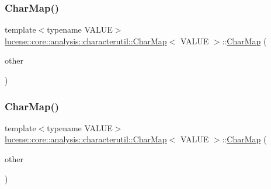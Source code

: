 \subsubsection{\texorpdfstring{Char\+Map()}{CharMap()}\hspace{0.1cm}{\footnotesize\ttfamily [4/5]}}
{\footnotesize\ttfamily template$<$typename V\+A\+L\+UE$>$ \\
\mbox{\hyperlink{classlucene_1_1core_1_1analysis_1_1characterutil_1_1CharMap}{lucene\+::core\+::analysis\+::characterutil\+::\+Char\+Map}}$<$ V\+A\+L\+UE $>$\+::\mbox{\hyperlink{classlucene_1_1core_1_1analysis_1_1characterutil_1_1CharMap}{Char\+Map}} (\begin{DoxyParamCaption}\item[{\mbox{\hyperlink{ZlibCrc32_8h_a2c212835823e3c54a8ab6d95c652660e}{const}} \mbox{\hyperlink{classlucene_1_1core_1_1analysis_1_1characterutil_1_1CharMap}{Char\+Map}}$<$ V\+A\+L\+UE $>$ \&}]{other }\end{DoxyParamCaption})\hspace{0.3cm}{\ttfamily [inline]}}

\mbox{\label{classlucene_1_1core_1_1analysis_1_1characterutil_1_1CharMap_aa83b5c7a819e10d002d8d06bc6ad45a0}} 
\subsubsection{\texorpdfstring{Char\+Map()}{CharMap()}\hspace{0.1cm}{\footnotesize\ttfamily [5/5]}}
{\footnotesize\ttfamily template$<$typename V\+A\+L\+UE$>$ \\
\mbox{\hyperlink{classlucene_1_1core_1_1analysis_1_1characterutil_1_1CharMap}{lucene\+::core\+::analysis\+::characterutil\+::\+Char\+Map}}$<$ V\+A\+L\+UE $>$\+::\mbox{\hyperlink{classlucene_1_1core_1_1analysis_1_1characterutil_1_1CharMap}{Char\+Map}} (\begin{DoxyParamCaption}\item[{\mbox{\hyperlink{ZlibCrc32_8h_a2c212835823e3c54a8ab6d95c652660e}{const}} \mbox{\hyperlink{classlucene_1_1core_1_1analysis_1_1characterutil_1_1CharMap}{Char\+Map}}$<$ V\+A\+L\+UE $>$ \&\&}]{other }\end{DoxyParamCaption})\hspace{0.3cm}{\ttfamily [inline]}}

